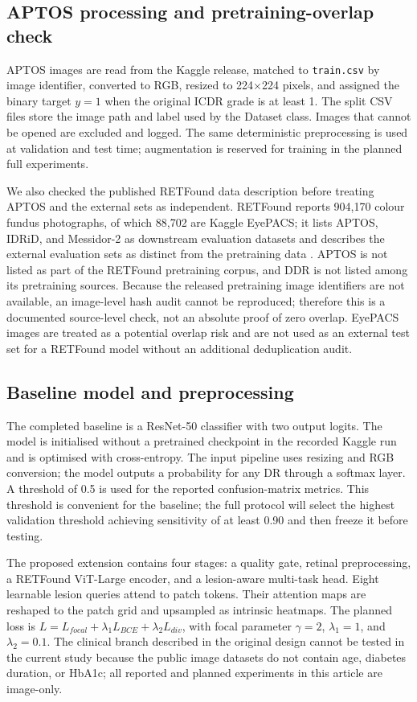 \documentclass[11pt,a4paper]{article}
\begin{document}
\subsection{APTOS processing and pretraining-overlap check}
APTOS images are read from the Kaggle release, matched to \texttt{train.csv} by image identifier, converted to RGB, resized to 224$\times$224 pixels, and assigned the binary target $y=1$ when the original ICDR grade is at least 1. The split CSV files store the image path and label used by the Dataset class. Images that cannot be opened are excluded and logged. The same deterministic preprocessing is used at validation and test time; augmentation is reserved for training in the planned full experiments.

We also checked the published RETFound data description before treating APTOS and the external sets as independent. RETFound reports 904,170 colour fundus photographs, of which 88,702 are Kaggle EyePACS; it lists APTOS, IDRiD, and Messidor-2 as downstream evaluation datasets and describes the external evaluation sets as distinct from the pretraining data \cite{zhou2023}. APTOS is not listed as part of the RETFound pretraining corpus, and DDR is not listed among its pretraining sources. Because the released pretraining image identifiers are not available, an image-level hash audit cannot be reproduced; therefore this is a documented source-level check, not an absolute proof of zero overlap. EyePACS images are treated as a potential overlap risk and are not used as an external test set for a RETFound model without an additional deduplication audit.

\subsection{Baseline model and preprocessing}
The completed baseline is a ResNet-50 classifier with two output logits. The model is initialised without a pretrained checkpoint in the recorded Kaggle run and is optimised with cross-entropy. The input pipeline uses resizing and RGB conversion; the model outputs a probability for any DR through a softmax layer. A threshold of 0.5 is used for the reported confusion-matrix metrics. This threshold is convenient for the baseline; the full protocol will select the highest validation threshold achieving sensitivity of at least 0.90 and then freeze it before testing.

The proposed extension contains four stages: a quality gate, retinal preprocessing, a RETFound ViT-Large encoder, and a lesion-aware multi-task head. Eight learnable lesion queries attend to patch tokens. Their attention maps are reshaped to the patch grid and upsampled as intrinsic heatmaps. The planned loss is $L=L_{focal}+\lambda_1L_{BCE}+\lambda_2L_{div}$, with focal parameter $\gamma=2$, $\lambda_1=1$, and $\lambda_2=0.1$. The clinical branch described in the original design cannot be tested in the current study because the public image datasets do not contain age, diabetes duration, or HbA1c; all reported and planned experiments in this article are image-only.
\end{document}
